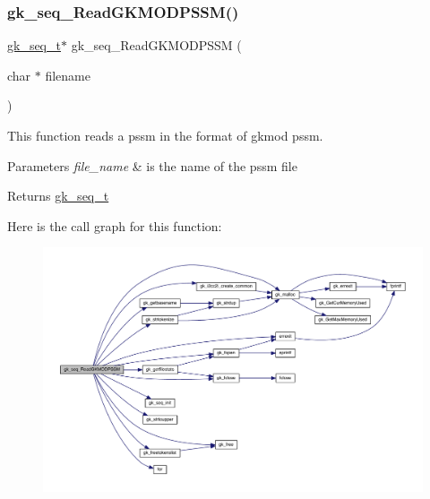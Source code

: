 \subsubsection{\texorpdfstring{gk\+\_\+seq\+\_\+\+Read\+G\+K\+M\+O\+D\+P\+S\+S\+M()}{gk\_seq\_ReadGKMODPSSM()}}
{\footnotesize\ttfamily \hyperlink{a00674}{gk\+\_\+seq\+\_\+t}$\ast$ gk\+\_\+seq\+\_\+\+Read\+G\+K\+M\+O\+D\+P\+S\+SM (\begin{DoxyParamCaption}\item[{char $\ast$}]{filename }\end{DoxyParamCaption})}



This function reads a pssm in the format of gkmod pssm. 


\begin{DoxyParams}{Parameters}
{\em file\+\_\+name} & is the name of the pssm file \\
\hline
\end{DoxyParams}
\begin{DoxyReturn}{Returns}
\hyperlink{a00674}{gk\+\_\+seq\+\_\+t} 
\end{DoxyReturn}
Here is the call graph for this function\+:\nopagebreak
\begin{figure}[H]
\begin{center}
\leavevmode
\includegraphics[width=350pt]{a00137_ad44124c9b40b8ffda2276f877526a261_cgraph}
\end{center}
\end{figure}

